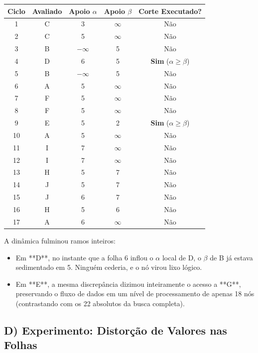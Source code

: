 \begin{table}[H]
\centering
\begin{tabular}{|c|c|c|c|c|}
\hline
\textbf{Ciclo} & \textbf{Avaliado} & \textbf{Apoio $\alpha$} & \textbf{Apoio $\beta$} & \textbf{Corte Executado?} \\ \hline
1 & C & 3 & $\infty$ & Não \\ \hline
2 & C & 5 & $\infty$ & Não \\ \hline
3 & B & $-\infty$ & 5 & Não \\ \hline
4 & D & 6 & 5 & \textbf{Sim} ($\alpha \ge \beta$) \\ \hline
5 & B & $-\infty$ & 5 & Não \\ \hline
6 & A & 5 & $\infty$ & Não \\ \hline
7 & F & 5 & $\infty$ & Não \\ \hline
8 & F & 5 & $\infty$ & Não \\ \hline
9 & E & 5 & 2 & \textbf{Sim} ($\alpha \ge \beta$) \\ \hline
10 & A & 5 & $\infty$ & Não \\ \hline
11 & I & 7 & $\infty$ & Não \\ \hline
12 & I & 7 & $\infty$ & Não \\ \hline
13 & H & 5 & 7 & Não \\ \hline
14 & J & 5 & 7 & Não \\ \hline
15 & J & 6 & 7 & Não \\ \hline
16 & H & 5 & 6 & Não \\ \hline
17 & A & 6 & $\infty$ & Não \\ \hline
\end{tabular}
\end{table}

A dinâmica fulminou ramos inteiros:
\begin{itemize}
    \item Em **D**, no instante que a folha 6 inflou o $\alpha$ local de D, o $\beta$ de B já estava sedimentado em 5. Ninguém cederia, e o nó virou lixo lógico.
    \item Em **E**, a mesma discrepância dizimou inteiramente o acesso a **G**, preservando o fluxo de dados em um nível de processamento de apenas 18 nós (contrastando com os 22 absolutos da busca completa).
\end{itemize}

\subsection*{D) Experimento: Distorção de Valores nas Folhas}

